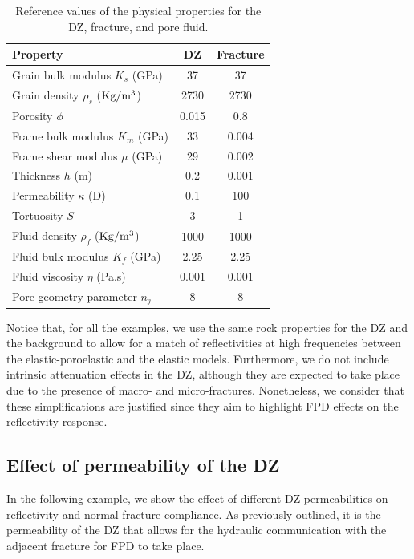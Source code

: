 \documentclass[draft]{agujournal2019}
\begin{document}
\begin{table}[!ht]
  \caption{Reference values of the physical properties for the DZ, fracture, and pore fluid.}
\begin{center}
  \begin{tabular}{ | l | c | c| }
    \hline
    Property & DZ & Fracture \\ \hline
    Grain bulk modulus $K_s$ (\rm{GPa}) & 37 & 37 \\ 
    Grain density $\rho_s$ ($\rm{Kg/m^3}$) & 2730 & 2730 \\
    Porosity $\phi$ & 0.015 & 0.8 \\
    Frame bulk modulus $K_m$ (\rm{GPa}) & 33 & 0.004\\ 
    Frame shear modulus $\mu$ (\rm{GPa}) & 29 & 0.002 \\
    Thickness $h$ (m) & 0.2 & 0.001\\ 
    Permeability $\kappa$ (D) & 0.1 & 100\\
    Tortuosity $S$ & 3 & 1\\
    Fluid density $\rho_f$ ($\rm{Kg/m^3}$) & 1000 & 1000\\
    Fluid bulk modulus $K_f$ (\rm{GPa}) & 2.25 & 2.25\\
    Fluid viscosity $\eta$ (\rm{Pa.s})& 0.001 & 0.001\\
    Pore geometry parameter $n_j$ & 8 & 8\\
    \hline
  \end{tabular}
  \label{table:1}
\end{center}
\end{table}

Notice that, for  all the examples, we use the same rock properties for the DZ and the background to allow for a match of reflectivities at high frequencies between the elastic-poroelastic and the elastic models. Furthermore, we do not include intrinsic attenuation effects in the DZ, although they are expected to take place due to the presence of macro- and micro-fractures. Nonetheless, we consider that these simplifications are justified since they aim to highlight FPD effects on the reflectivity response.

\subsection{ Effect of permeability of the DZ}
In the following example, we show the effect of different DZ permeabilities on reflectivity and  normal fracture compliance. As previously outlined, it is the permeability of the DZ that allows for the hydraulic communication with the adjacent fracture for FPD to take place.
\end{document}
